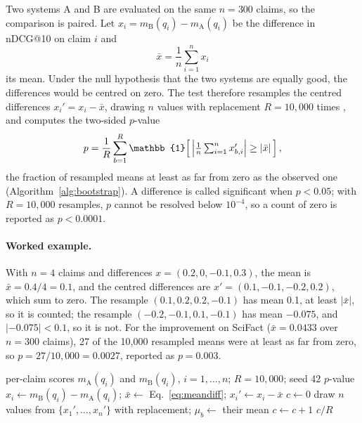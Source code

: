 Two systems A and B are evaluated on the same $n = 300$ claims, so the comparison is paired. Let
$x_i = m_{\mathrm{B}}(q_i) - m_{\mathrm{A}}(q_i)$ be the difference in nDCG@10 on claim $i$ and
\begin{equation}
\bar{x} = \frac{1}{n} \sum_{i=1}^{n} x_i
\label{eq:meandiff}
\end{equation}
its mean. Under the null hypothesis that the two systems are equally good, the differences would
be centred on zero. The test therefore resamples the centred differences
$x_i' = x_i - \bar{x}$, drawing $n$ values with replacement $R = 10{,}000$ times
\parencite{efron1993bootstrap,koehn2004significance}, and computes the two-sided $p$-value
\begin{equation}
p = \frac{1}{R} \sum_{b=1}^{R}
\mathbb{1}\!\left[\,\Bigl|\tfrac{1}{n}\textstyle\sum_{i=1}^{n} x_{b,i}'\Bigr| \ge |\bar{x}|\,\right],
\label{eq:pvalue}
\end{equation}
the fraction of resampled means at least as far from zero as the observed one
(Algorithm~\ref{alg:bootstrap}). A difference is called significant when $p < 0.05$; with
$R = 10{,}000$ resamples, $p$ cannot be resolved below $10^{-4}$, so a count of zero is reported
as $p < 0.0001$.

\paragraph{Worked example.} With $n = 4$ claims and differences $x = (0.2, 0, -0.1, 0.3)$, the
mean is $\bar{x} = 0.4 / 4 = 0.1$, and the centred differences are
$x' = (0.1, -0.1, -0.2, 0.2)$, which sum to zero. The resample $(0.1, 0.2, 0.2, -0.1)$ has mean
0.1, at least $|\bar{x}|$, so it is counted; the resample $(-0.2, -0.1, 0.1, -0.1)$ has mean
$-0.075$, and $|-0.075| < 0.1$, so it is not. For the improvement on SciFact
($\bar{x} = 0.0433$ over $n = 300$ claims), 27 of the 10,000 resampled means were at least as
far from zero, so $p = 27 / 10{,}000 = 0.0027$, reported as $p = 0.003$.

\begin{algorithm}[t]
\caption{Two-sided paired bootstrap test}
\label{alg:bootstrap}
\begin{algorithmic}[1]
\Require per-claim scores $m_{\mathrm{A}}(q_i)$ and $m_{\mathrm{B}}(q_i)$, $i = 1, \dots, n$; $R = 10{,}000$; seed 42
\Ensure $p$-value
\State $x_i \gets m_{\mathrm{B}}(q_i) - m_{\mathrm{A}}(q_i)$; $\bar{x} \gets$ Eq.~\eqref{eq:meandiff}; $x_i' \gets x_i - \bar{x}$
\State $c \gets 0$
  \State draw $n$ values from $\{x_1', \dots, x_n'\}$ with replacement; $\mu_b \gets$ their mean
   $c \gets c + 1$ \EndIf
\EndFor
\State \Return $c / R$
\end{algorithmic}
\end{algorithm}
